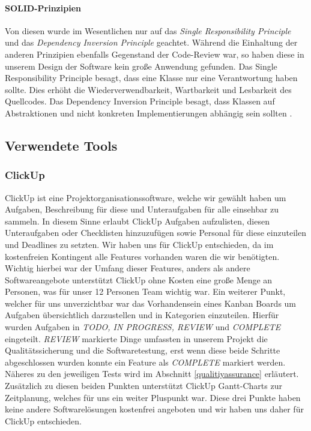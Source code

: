 \documentclass[12pt,a4paper]{scrartcl}
\newcommand{\italic}[1]{\textit{#1}}
\begin{document}
\paragraph{SOLID-Prinzipien}
Von diesen wurde im Wesentlichen nur auf das \italic{Single Responsibility Principle} und das \italic{Dependency Inversion Principle} geachtet.
Während die Einhaltung der anderen Prinzipien ebenfalls Gegenstand der Code-Review war, so haben diese in unserem Design der Software kein große Anwendung gefunden.
Das Single Responsibility Principle besagt, dass eine Klasse nur eine Verantwortung haben sollte.
Dies erhöht die Wiederverwendbarkeit, Wartbarkeit und Lesbarkeit des Quellcodes.
Das Dependency Inversion Principle besagt, dass Klassen auf Abstraktionen und nicht konkreten Implementierungen abhängig sein sollten \cite{Goll.2014}.

\subsection{Verwendete Tools}
\subsubsection{ClickUp}
\label{clickup}
ClickUp ist eine Projektorganisationssoftware, welche wir gewählt haben um Aufgaben, Beschreibung für diese und Unteraufgaben für alle einsehbar zu sammeln.
In diesem Sinne erlaubt ClickUp Aufgaben aufzulisten, diesen Unteraufgaben oder Checklisten hinzuzufügen sowie Personal für diese einzuteilen und Deadlines zu setzten.
Wir haben uns für ClickUp entschieden, da im kostenfreien Kontingent alle Features vorhanden waren die wir benötigten.
Wichtig hierbei war der Umfang dieser Features, anders als andere Softwareangebote unterstützt ClickUp ohne Kosten eine große Menge an Personen, was für unser 12 Personen Team wichtig war.
Ein weiterer Punkt, welcher für uns unverzichtbar war das Vorhandensein eines Kanban Boards um Aufgaben übersichtlich darzustellen und in Kategorien einzuteilen. 
Hierfür wurden Aufgaben in \italic{TODO, IN PROGRESS, REVIEW} und \italic{COMPLETE} eingeteilt.
\italic{REVIEW} markierte Dinge umfassten in unserem Projekt die Qualitätssicherung und die Softwaretestung, erst wenn diese beide Schritte abgeschlossen wurden konnte ein Feature als \italic{COMPLETE} markiert werden.
Näheres zu den jeweiligen Tests wird im Abschnitt \ref{qualitiyassurance} erläutert.
Zusätzlich zu diesen beiden Punkten unterstützt ClickUp Gantt-Charts zur Zeitplanung, welches für uns ein weiter Pluspunkt war.
Diese drei Punkte haben keine andere Softwarelösungen kostenfrei angeboten und wir haben uns daher für ClickUp entschieden.
\end{document}
